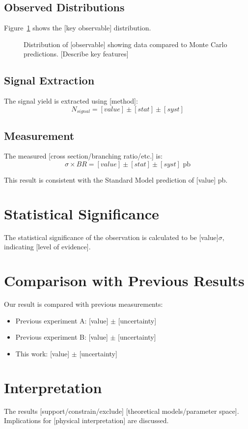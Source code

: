 \subsection{Observed Distributions}

Figure~\ref{fig:main-result} shows the [key observable] distribution.

\begin{figure}[htbp]
  \centering
  \caption{Distribution of [observable] showing data compared to Monte Carlo predictions. [Describe key features]}
  \label{fig:main-result}
\end{figure}

\subsection{Signal Extraction}

The signal yield is extracted using [method]:
\begin{equation}
  N_{signal} = [value] \pm [stat] \pm [syst]
  \label{eq:signal-yield}
\end{equation}

\subsection{Measurement}

The measured [cross section/branching ratio/etc.] is:
\begin{equation}
  \sigma \times BR = [value] \pm [stat] \pm [syst] \text{ pb}
  \label{eq:measurement}
\end{equation}

This result is consistent with the Standard Model prediction of [value] pb.

\section{Statistical Significance}

The statistical significance of the observation is calculated to be [value]$\sigma$, indicating [level of evidence].

\section{Comparison with Previous Results}

Our result is compared with previous measurements:
\begin{itemize}
  \item Previous experiment A: [value] $\pm$ [uncertainty]
  \item Previous experiment B: [value] $\pm$ [uncertainty]
  \item This work: [value] $\pm$ [uncertainty]
\end{itemize}

\section{Interpretation}

The results [support/constrain/exclude] [theoretical models/parameter space]. Implications for [physical interpretation] are discussed.
